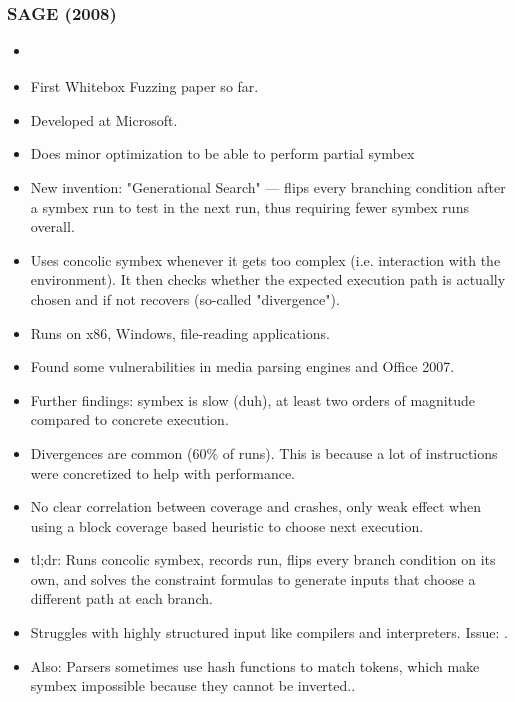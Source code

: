 \documentclass{article}
\begin{document}
\subsubsection{SAGE (2008)}
\begin{itemize}
    \item \cite{SAGE}
    \item First Whitebox Fuzzing paper so far.
    \item Developed at Microsoft.
    \item Does minor optimization to be able to perform partial symbex
    \item New invention: "Generational Search" — flips every branching condition after a symbex run to test in the next run, thus requiring fewer symbex runs overall.
    \item Uses concolic symbex whenever it gets too complex (i.e. interaction with the environment). It then checks whether the expected execution path is actually chosen and if not recovers (so-called "divergence").
    \item Runs on x86, Windows, file-reading applications.
    \item Found some vulnerabilities in media parsing engines and Office 2007.
    \item Further findings: symbex is slow (duh), at least two orders of magnitude compared to concrete execution.
    \item Divergences are common (60\% of runs). This is because a lot of instructions were concretized to help with performance.
    \item No clear correlation between coverage and crashes, only weak effect when using a block coverage based heuristic to choose next execution.
    \item tl;dr: Runs concolic symbex, records run, flips every branch condition on its own, and solves the constraint formulas to generate inputs that choose a different path at each branch.
    \item Struggles with highly structured input like compilers and interpreters. Issue: \cite{GrammarBasedWhiteboxFuzzing}.
    \item Also: Parsers sometimes use hash functions to match tokens, which make symbex impossible because they cannot be inverted.\cite{GrammarBasedWhiteboxFuzzing}.
\end{itemize}
\end{document}
